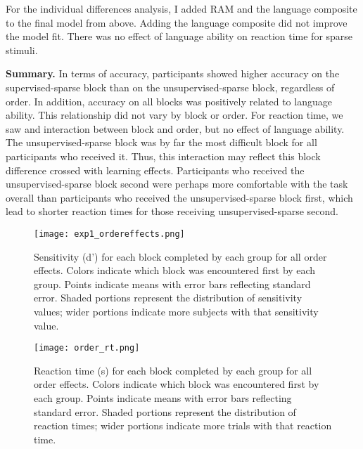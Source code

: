\documentclass[../dissertation.tex]{subfiles}
\begin{document}
	For the individual differences analysis, I added RAM and the language composite to the final model from above. Adding the language composite did not improve the model fit. There was no effect of language ability on reaction time for sparse stimuli. \par
	\textbf{Summary.} In terms of accuracy, participants showed higher accuracy on the supervised-sparse block than on the unsupervised-sparse block, regardless of order. In addition, accuracy on all blocks was positively related to language ability. This relationship did not vary by block or order. For reaction time, we saw and interaction between block and order, but no effect of language ability. The unsupervised-sparse block was by far the most difficult block for all participants who received it. Thus, this interaction may reflect this block difference crossed with learning effects. Participants who received the unsupervised-sparse block second were perhaps more comfortable with the task overall than participants who received the unsupervised-sparse block first, which lead to shorter reaction times for those receiving unsupervised-sparse second.
	
\begin{figure}[H]
\vspace{-10pt}
\texttt{[image: exp1\_ordereffects.png]}
\caption[Sensitivity plot for all order effects]{Sensitivity (d') for each block completed by each group for all order effects. Colors indicate which block was encountered first by each group. Points indicate means with error bars reflecting standard error. Shaded portions represent the distribution of sensitivity values; wider portions indicate more subjects with that sensitivity value.}
\label{oes}
\vspace{-10pt}
\end{figure}	

\begin{figure}[H]
\vspace{-10pt}
\texttt{[image: order\_rt.png]}
\caption[Reaction time plot for all order effects]{Reaction time (s) for each block completed by each group for all order effects. Colors indicate which block was encountered first by each group. Points indicate means with error bars reflecting standard error. Shaded portions represent the distribution of reaction times; wider portions indicate more trials with that reaction time.}
\label{oe_rt}
\vspace{-10pt}
\end{figure}	
\end{document}
